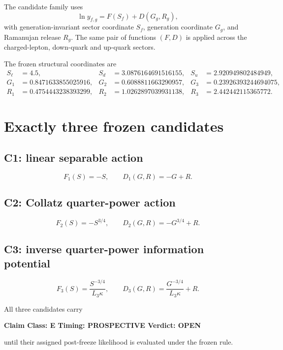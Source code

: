 \documentclass[11pt,a4paper,twoside]{book}
\theoremstyle{definition}
\newcommand{\vTwelveStatus}[3]{\par\noindent\textbf{Claim Class: #1 \quad Timing: #2 \quad Verdict: #3}\par}
\begin{document}
The candidate family uses
\begin{equation}
\boxed{
\ln y_{f,g}=F(S_f)+D(G_g,R_g),
}
\label{eq:v12_prospective_separable}
\end{equation}
with generation-invariant sector coordinate $S_f$, generation coordinate $G_g$, and Ramanujan release $R_g$. The same pair of functions $(F,D)$ is applied across the charged-lepton, down-quark and up-quark sectors.

The frozen structural coordinates are
\begin{align}
S_\ell&=4.5,
&S_d&=3.0876164691516155,
&S_u&=2.920949802484949,\\
G_1&=0.8471633855025916,
&G_2&=0.6088811663290957,
&G_3&=0.23926393244694075,\\
R_1&=0.4754443238393299,
&R_2&=1.0262897039931138,
&R_3&=2.442442115365772.
\end{align}

\section{Exactly three frozen candidates}

\subsection{C1: linear separable action}
\begin{equation}
F_1(S)=-S,
\qquad
D_1(G,R)=-G+R.
\end{equation}

\subsection{C2: Collatz quarter-power action}
\begin{equation}
F_2(S)=-S^{3/4},
\qquad
D_2(G,R)=-G^{3/4}+R.
\end{equation}

\subsection{C3: inverse quarter-power information potential}
\begin{equation}
F_3(S)=\frac{S^{-3/4}}{L_3\kappa},
\qquad
D_3(G,R)=\frac{G^{-3/4}}{L_3\kappa}+R.
\end{equation}

All three candidates carry
\vTwelveStatus{E}{PROSPECTIVE}{OPEN}
until their assigned post-freeze likelihood is evaluated under the frozen rule.
\end{document}
